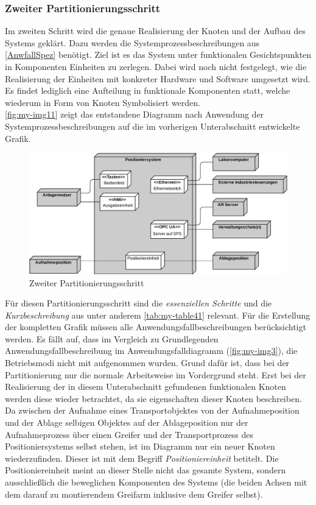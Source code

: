 \documentclass[../../../Bachelorarbeit.tex]{subfiles}
\begin{document}
\subsubsection{Zweiter Partitionierungsschritt}
Im zweiten Schritt wird die genaue Realisierung der Knoten und der Aufbau des Systems geklärt. Dazu werden die Systemprozessbeschreibungen aus \autoref{AnwfallSpez} benötigt. Ziel ist es das System unter funktionalen Gesichtspunkten in Komponenten \bzw Einheiten zu zerlegen. Dabei wird noch nicht festgelegt, wie die Realisierung der Einheiten mit konkreter Hardware und Software umgesetzt wird. Es findet lediglich eine Aufteilung in funktionale Komponenten statt, welche wiederum in Form von Knoten Symbolisiert werden. \\
\autoref{fig:my-img11} zeigt das entstandene Diagramm nach Anwendung der Systemprozessbeschreibungen auf die im vorherigen Unterabschnitt entwickelte Grafik. 

\begin{figure}[H]
    \centering
    \includegraphics[width=\textwidth]{Images/zweiter_schritt.pdf}
    \caption[Zweiter Partitionierungsschritt]{Zweiter Partitionierungsschritt}
    \label{fig:my-img11}
\end{figure}

Für diesen Partitionierungsschritt sind die \textit{essenziellen Schritte} und die \textit{Kurzbeschreibung} aus unter anderem \autoref{tab:my-table41} relevant. Für die Erstellung der kompletten Grafik müssen alle Anwendungsfallbeschreibungen berücksichtigt werden. Es fällt auf, dass im Vergleich zu Grundlegenden Anwendungsfallbeschreibung im Anwendungsfalldiagramm (\autoref{fig:my-img3}), die Betriebsmodi nicht mit aufgenommen wurden. Grund dafür ist, dass bei der Partitionierung nur die normale Arbeitsweise im Vordergrund steht. Erst bei der Realisierung der in diesem Unterabschnitt gefundenen funktionalen Knoten werden diese wieder betrachtet, da sie eigenschaften dieser Knoten beschreiben.\\
Da zwischen der Aufnahme eines Transportobjektes von der Aufnahmeposition und der Ablage selbigen Objektes auf der Ablageposition nur der Aufnahmeprozess über einen Greifer und der Transportprozess des Positioniersystems selbst stehen, ist im Diagramm nur ein neuer Knoten wiederzufinden. Dieser ist mit dem Begriff \textit{Positioniereinheit} betitelt. Die Positioniereinheit meint an dieser Stelle nicht das gesamte System, sondern ausschließlich die beweglichen Komponenten des Systems (die beiden Achsen mit dem darauf zu montierendem Greifarm inklusive dem Greifer selbst).
\end{document}
